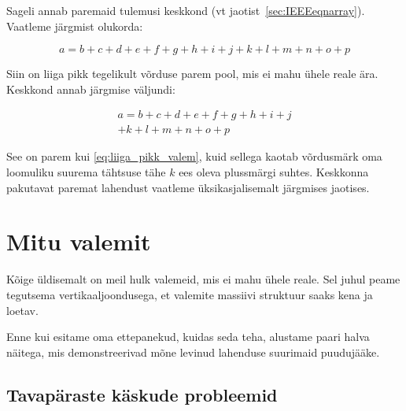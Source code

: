 Sageli annab paremaid tulemusi keskkond  (vt
jaotist~\ref{sec:IEEEeqnarray}). Vaatleme järgmist olukorda:
\begin{example}
\begin{equation}
  a = b + c + d + e + f
  + g + h + i + j
  + k + l + m + n + o + p
  \label{eq:liiga_pikk_valem}
\end{equation}
\end{example}
\noindent
Siin on liiga pikk tegelikult võrduse parem pool, mis ei mahu ühele
reale ära. Keskkond  annab järgmise väljundi:
\begin{example}
\begin{multline}
  a = b + c + d + e + f
  + g + h + i + j \\
  + k + l + m + n + o + p
\end{multline}
\end{example}
\noindent See on parem kui \eqref{eq:liiga_pikk_valem}, kuid sellega
kaotab võrdusmärk oma loomuliku suurema tähtsuse tähe $k$ ees
oleva plussmärgi suhtes. Keskkonna  pakutavat paremat
lahendust vaatleme üksikasjalisemalt järgmises jaotises.

\section{Mitu valemit}
\label{sec:IEEEeqnarray}

Kõige üldisemalt on meil hulk valemeid, mis ei mahu ühele reale. Sel
juhul peame tegutsema vertikaaljoondusega, et valemite massiivi struktuur
saaks kena ja loetav.

Enne kui esitame oma ettepanekud, kuidas seda teha, alustame paari halva
näitega, mis demonstreerivad mõne levinud lahenduse suurimaid
puudujääke.

\subsection{Tavapäraste käskude probleemid}
\label{sec:problems_traditional}


